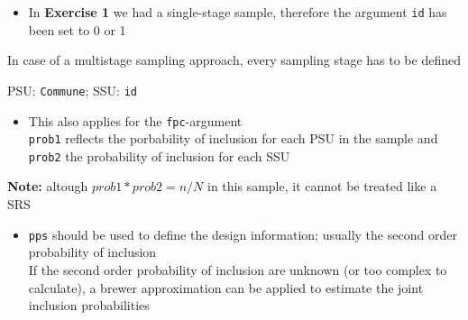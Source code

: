 \documentclass[]{article}
\begin{document}
\begin{itemize}
\itemsep1pt\parskip0pt
\item
  In \textbf{Exercise 1} we had a single-stage sample, therefore the
  argument \texttt{id} has been set to 0 or 1
\end{itemize}

In case of a multistage sampling approach, every sampling stage has to
be defined

PSU: \texttt{Commune}; SSU: \texttt{id}

\begin{itemize}
\itemsep1pt\parskip0pt
\item
  This also applies for the \texttt{fpc}-argument\\ \texttt{prob1}
  reflects the porbability of inclusion for each PSU in the sample and
  \texttt{prob2} the probability of inclusion for each SSU
\end{itemize}

\textbf{Note:} altough \(prob1*prob2=n/N\) in this sample, it cannot be
treated like a SRS

\begin{itemize}
\itemsep1pt\parskip0pt
\item
  \texttt{pps} should be used to define the design information; usually
  the second order probability of inclusion\\ If the second order
  probability of inclusion are unknown (or too complex to calculate), a
  brewer approximation can be applied to estimate the joint inclusion
  probabilities
\end{itemize}
\end{document}
